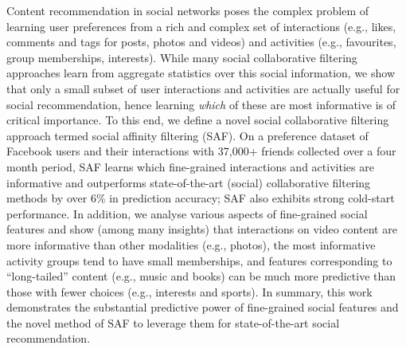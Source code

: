 %

Content recommendation in social networks poses the complex problem of
learning user preferences from a rich and complex set of interactions
(e.g., likes, comments and tags for posts, photos and videos) and
activities (e.g., favourites, group memberships, interests).  While
many social collaborative filtering approaches learn from aggregate
statistics over this social information, we show that only a small
subset of user interactions and activities are actually useful for
social recommendation, hence learning \emph{which} of these are most
informative is of critical importance.  To this end, we define a novel
social collaborative filtering approach termed social affinity
filtering (SAF).  On a preference dataset of Facebook users and their
interactions with 37,000+ friends collected over a four month period,
SAF learns which fine-grained interactions and activities are
informative and outperforms state-of-the-art (social)
collaborative filtering methods by over 6\% in prediction accuracy; 
SAF also exhibits strong cold-start performance.
In addition, we analyse various aspects of fine-grained social
features and show (among many insights) that interactions on video
content are more informative than other modalities (e.g.,
photos), the most informative activity groups tend to have small
memberships, and features corresponding to ``long-tailed'' content
(e.g., music and books) can be much more predictive than those with
fewer choices (e.g., interests and sports).  In summary, this work
demonstrates the substantial predictive power of fine-grained 
social features and the novel method of SAF to
leverage them for state-of-the-art social recommendation.



